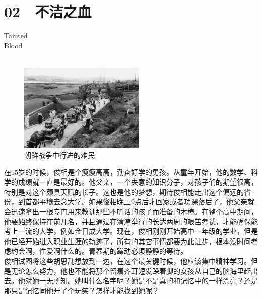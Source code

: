 \fancyhead[RO]{{\tiny{\textcolor{Gray}{\FA \ }}}\thepage}
\fancyhead[LE]{{\tiny{\textcolor{Gray}{\FA \ }}}\thepage}
\fancyfoot[LE,RO]{}
\fancyfoot[LO,CE]{}
\fancyfoot[CO,RE]{}
\chapter*{02 {\FA } 不洁之血}
\vspace{5mm}
\begin{flushright}
	\textcolor{PinYinColor}{\EN \huge{Tainted\\
		Blood\\
	\ \\}}
\end{flushright}
\begin{figure}[!htbp]
	\centering
	\includegraphics[width=6cm]{./Chapters/Images/02.jpg}
	\caption*{朝鲜战争中行进的难民}
\end{figure}


在15岁的时候，俊相是个瘦瘦高高，勤奋好学的男孩。从童年开始，他的数学、科学的成绩就一直是最好的。他父亲，一个失意的知识分子，对孩子们的期望很高，特别是对这个颇具天赋的长子。这也是他的梦想，期待俊相能走出这个偏远的省份，到首都平壤去念大学。如果俊相晚上9点后才回家或者功课落后了，他父亲就会迅速拿出一根专门用来教训那些不听话的孩子而准备的木棒。在整个高中期间，他要始终保持在前几名，并且通过在清津举行的长达两周的艰苦考试，才能确保能考上一流的大学，例如金日成大学。现在，俊相刚刚开始高中一年级的学业，但是他已经开始进入职业生涯的轨迹了，所有的其它事情都要为此让步，根本没时间考虑约会啊，性爱啊什么的。青春期的躁动必须静静的等待。\\

俊相试图将这些胡思乱想放到一边，在这个最关键时候，他应该集中精神学习。但是无论怎么努力，他也不能将那个留着齐耳短发跺着脚的女孩从自己的脑海里赶出去。他对她一无所知。她叫什么名字呢？她是不是真的和记忆中的一样漂亮？还是那只是记忆同他开了个玩笑？怎样才能找到她呢？\\

